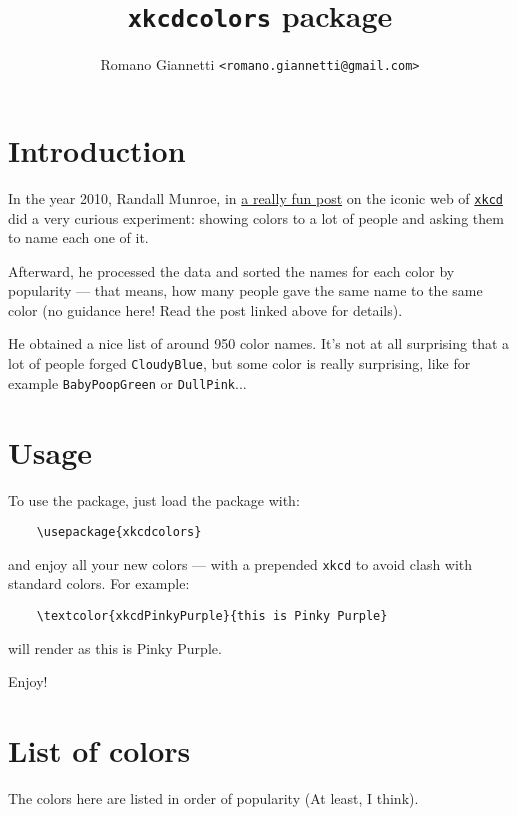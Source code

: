 \documentclass[12pt]{article}
\title{\texttt{xkcdcolors} package}
\author{Romano Giannetti \texttt{<romano.giannetti@gmail.com>}}
\begin{document}
\maketitle
\section{Introduction}

In the year 2010, Randall Munroe, in \href{https://blog.xkcd.com/2010/05/03/color-survey-results/}{a really fun post} on the iconic web of \href{https://xkcd.com/}{\texttt{xkcd}} did a very curious experiment: showing colors to a lot of people and asking them to name each one of it.

Afterward, he processed the data and sorted the names for each color by popularity --- that means, how many people gave the same name to the same color (no guidance here! Read the post linked above for details).

He obtained a nice list of around 950 color names. It's not at all surprising that a lot of people forged \texttt{CloudyBlue}, but some color is really surprising, like for example \texttt{BabyPoopGreen} or \texttt{DullPink}...

\section{Usage}
To use the package, just load the package with:

\begin{verbatim}
    \usepackage{xkcdcolors}
\end{verbatim}

\noindent and enjoy all your new colors --- with a prepended \texttt{xkcd} to avoid clash with standard colors. For example:

\begin{verbatim}
    \textcolor{xkcdPinkyPurple}{this is Pinky Purple}
\end{verbatim}

\noindent will render as \textcolor{xkcdPinkyPurple}{this is Pinky Purple}.

\bigskip

\noindent Enjoy!

\section{List of colors}
The colors here are listed in order of popularity (At least, I think).
\end{document}
